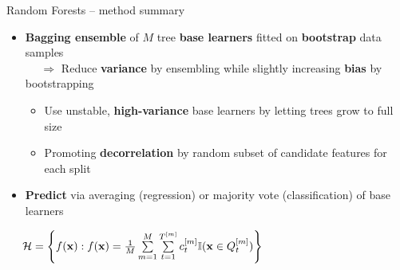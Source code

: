 \begin{frame}{Random Forests -- method summary}

 
  

\medskip

\begin{itemize}
  \item \textbf{Bagging ensemble} of $M$ tree \textbf{base learners} fitted on \textbf{bootstrap} data samples\\
   ~~ $\Rightarrow$ Reduce \textbf{variance} by ensembling while slightly increasing \textbf{bias} by bootstrapping  
   \begin{itemize}
    \item Use unstable, \textbf{high-variance} base learners by letting trees grow to full size
    \item Promoting \textbf{decorrelation} by random subset of candidate features for each split
  \end{itemize}
  \item \textbf{Predict} via averaging (regression) or majority vote (classification) of base learners
\end{itemize}

\medskip

 ~~
$\mathcal{H} = \left\{ f(\mathbf{x}): f(\mathbf{x}) = \frac{1}{M} \sum\limits_{m = 1}^M 
\sum\limits_{t = 1}^{T^{[m]}} 
c_t^{[m]} \mathbb{I}(\mathbf{x} \in Q_t^{[m]}) \right\}$

\medskip


\end{frame}
